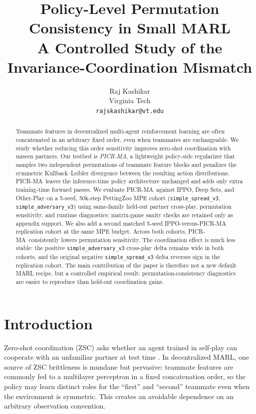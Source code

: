 \documentclass{article}
\title{Policy-Level Permutation Consistency in Small MARL\\A Controlled Study of the Invariance-Coordination Mismatch}
\author{%
  Raj Kashikar \\
  Virginia Tech \\
  \texttt{rajskashikar@vt.edu}
}
\newcommand{\method}{PICR-MA}
\begin{document}
\maketitle

\begin{abstract}
Teammate features in decentralized multi-agent reinforcement learning are often concatenated in an arbitrary fixed order, even when teammates are exchangeable. We study whether reducing this order sensitivity improves zero-shot coordination with unseen partners. Our testbed is \emph{PICR-MA}, a lightweight policy-side regularizer that samples two independent permutations of teammate feature blocks and penalizes the symmetric Kullback--Leibler divergence between the resulting action distributions. \method\ leaves the inference-time policy architecture unchanged and adds only extra training-time forward passes. We evaluate \method\ against IPPO, Deep Sets, and Other-Play on a 5-seed, 50k-step PettingZoo MPE cohort (\texttt{simple\_spread\_v3}, \texttt{simple\_adversary\_v3}) using same-family held-out partner cross-play, permutation sensitivity, and runtime diagnostics; matrix-game sanity checks are retained only as appendix support. We also add a second matched 5-seed IPPO-versus-PICR-MA replication cohort at the same MPE budget. Across both cohorts, \method\ consistently lowers permutation sensitivity. The coordination effect is much less stable: the positive \texttt{simple\_adversary\_v3} cross-play delta remains wide in both cohorts, and the original negative \texttt{simple\_spread\_v3} delta reverses sign in the replication cohort. The main contribution of the paper is therefore not a new default MARL recipe, but a controlled empirical result: permutation-consistency diagnostics are easier to reproduce than held-out coordination gains.
\end{abstract}

\section{Introduction}
Zero-shot coordination (ZSC) asks whether an agent trained in self-play can cooperate with an unfamiliar partner at test time \citep{hu2020otherplay}. In decentralized MARL, one source of ZSC brittleness is mundane but pervasive: teammate features are commonly fed to a multilayer perceptron in a fixed concatenation order, so the policy may learn distinct roles for the ``first'' and ``second'' teammate even when the environment is symmetric. This creates an avoidable dependence on an arbitrary observation convention.
\end{document}
